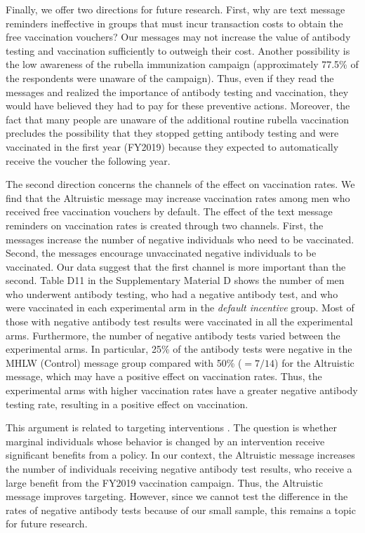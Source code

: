 \documentclass[
      12pt,
    a4paper
]{article}
\begin{document}
Finally, we offer two directions for future research. First, why are text message reminders ineffective in groups that must incur transaction costs to obtain the free vaccination vouchers? Our messages may not increase the value of antibody testing and vaccination sufficiently to outweigh their cost. Another possibility is the low awareness of the rubella immunization campaign (approximately 77.5\% of the respondents were unaware of the campaign). Thus, even if they read the messages and realized the importance of antibody testing and vaccination, they would have believed they had to pay for these preventive actions. Moreover, the fact that many people are unaware of the additional routine rubella vaccination precludes the possibility that they stopped getting antibody testing and were vaccinated in the first year (FY2019) because they expected to automatically receive the voucher the following year.

The second direction concerns the channels of the effect on vaccination rates. We find that the Altruistic message may increase vaccination rates among men who received free vaccination vouchers by default. The effect of the text message reminders on vaccination rates is created through two channels. First, the messages increase the number of negative individuals who need to be vaccinated. Second, the messages encourage unvaccinated negative individuals to be vaccinated. Our data suggest that the first channel is more important than the second. Table D11 in the Supplementary Material D shows the number of men who underwent antibody testing, who had a negative antibody test, and who were vaccinated in each experimental arm in the \emph{default incentive} group. Most of those with negative antibody test results were vaccinated in all the experimental arms. Furthermore, the number of negative antibody tests varied between the experimental arms. In particular, 25\% of the antibody tests were negative in the MHLW (Control) message group compared with 50\% (\(=7/14\)) for the Altruistic message, which may have a positive effect on vaccination rates. Thus, the experimental arms with higher vaccination rates have a greater negative antibody testing rate, resulting in a positive effect on vaccination.

This argument is related to targeting interventions \citep[e.g.,][]{Finkelstein2019}. The question is whether marginal individuals whose behavior is changed by an intervention receive significant benefits from a policy. In our context, the Altruistic message increases the number of individuals receiving negative antibody test results, who receive a large benefit from the FY2019 vaccination campaign. Thus, the Altruistic message improves targeting. However, since we cannot test the difference in the rates of negative antibody tests because of our small sample, this remains a topic for future research.
\end{document}
